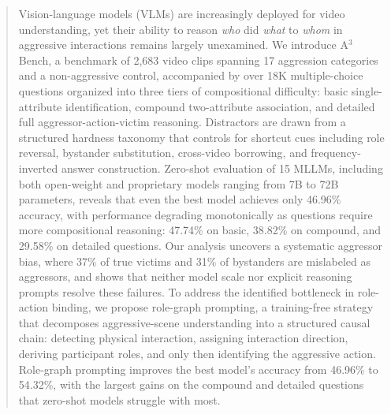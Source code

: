 \begin{abstract}

Vision-language models (VLMs) are increasingly deployed for video understanding, yet their ability to reason \emph{who} did \emph{what} to \emph{whom} in aggressive interactions remains largely unexamined. We introduce A$^3$Bench, a benchmark of 2,683 video clips spanning 17 aggression categories and a non-aggressive control, accompanied by over 18K multiple-choice questions organized into three tiers of compositional difficulty: basic single-attribute identification, compound two-attribute association, and detailed full aggressor-action-victim reasoning. Distractors are drawn from a structured hardness taxonomy that controls for shortcut cues including role reversal, bystander substitution, cross-video borrowing, and frequency-inverted answer construction. Zero-shot evaluation of 15 MLLMs, including both open-weight and proprietary models ranging from 7B to 72B parameters, reveals that even the best model achieves only 46.96\% accuracy, with performance degrading monotonically as questions require more compositional reasoning: 47.74\% on basic, 38.82\% on compound, and 29.58\% on detailed questions. Our analysis uncovers a systematic aggressor bias, where 37\% of true victims and 31\% of bystanders are mislabeled as aggressors, and shows that neither model scale nor explicit reasoning prompts resolve these failures. To address the identified bottleneck in role-action binding, we propose role-graph prompting, a training-free strategy that decomposes aggressive-scene understanding into a structured causal chain: detecting physical interaction, assigning interaction direction, deriving participant roles, and only then identifying the aggressive action. Role-graph prompting improves the best model's accuracy from 46.96\% to 54.32\%, with the largest gains on the compound and detailed questions that zero-shot models struggle with most.

\end{abstract}